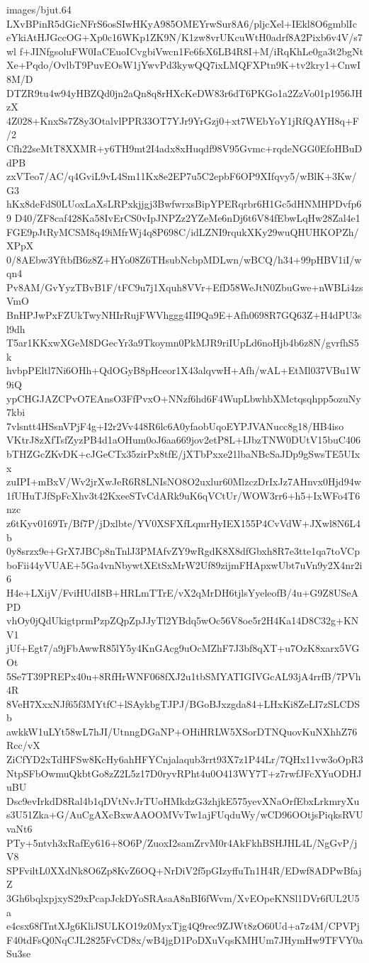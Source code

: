 \begin{filecontents*}{images/bjut.64}
LXvBPinR5dGicNFrS6osSIwHKyA985OMEYrwSur8A6/pljcXel+IEkl8O6gmblIc
eYkiAtHJGccOG+Xp0c16WKp1ZK9N/K1zw8vrUKcuWtH0adrf8A2Pixb6v4V/s7wl
f+JINfgsoluFW0IaCEuoICvgbiVwcn1Fe6fsX6LB4R8I+M/iRqKhLe0ga3t2bgNt
Xe+Pqdo/OvlbT9PuvEOsW1jYwvPd3kywQQ7ixLMQFXPtn9K+tv2kry1+CnwI8M/D
DTZR9tu4w94yHBZQd0jn2aQn8q8rHXcKeDW83r6dT6PKGo1a2ZzVo01p1956JHzX
4Z028+KnxSs7Z8y3OtalvlPPR33OT7YJr9YrGzj0+xt7WEbYoY1jRfQAYH8q+F/2
Cfh22seMtT8XXMR+y6TH9mt2I4adx8xHuqdf98V95Gvmc+rqdeNGG0EfoHBuDdPB
zxVTeo7/AC/q4GviL9vL4Sm11Kx8e2EP7u5C2epbF6OP9XIfqvy5/wBlK+3Kw/G3
hKx8deFdS0LUoxLaXsLRPxkjjgj3BwfwrxsBipYPERqrbr6H1Gc5dHNMHPDvfp69
D40/ZF8caf428Ka58IvErCS0vIpJNPZz2YZeMe6nDj6t6V84fEbwLqHw28Zal4e1
FGE9pJtRyMCSM8q49iMfrWj4q8P698C/idLZNI9rqukXKy29wuQHUHKOPZh/XPpX
0/8AEbw3YftbfB6z8Z+HYo08Z6THsubNcbpMDLwn/wBCQ/h34+99pHBV1iI/wqn4
Pv8AM/GvYyzTBvB1F/tFC9u7j1Xquh8VVr+EfD58WeJtN0ZbuGwe+nWBLi4zsVmO
BnHPJwPxFZUkTwyNHIrRujFWVhggg4II9Qa9E+Afh0698R7GQ63Z+H4dPU3sl9dh
T5ar1KKxwXGeM8DGecYr3a9Tkoymn0PkMJR9riIUpLd6noHjb4b6z8N/gvrfhS5k
hvbpPEltl7Ni6OHh+QdOGyB8pHceor1X43alqvwH+Afh/wAL+EtMl037VBu1W9iQ
ypCHGJAZCPvO7EAnsO3FfPvxO+NNzf6hd6F4WupLbwhbXMctqsqhpp5ozuNy7kbi
7vlsntt4HSsnVPjF4g+I2r2Vv448R6lc6A0yfaobUqoEYPJVANucc8g18/HB4iso
VKtrJ8zXfTsfZyzPB4d1aOHum0oJ6aa669jov2etP8L+IJbzTNW0DUtV15buC406
bTHZGcZKvDK+cJGeCTx35zirPx8tfE/jXTbPxxe21lbaNBcSaJDp9gSwsTE5UIxx
zuIPI+mBxV/Wv2jrXwJeR6R8LNIsNO8O2uxlur60MlzczDrIxJz7AHnvx0Hjd94w
1fUHuTJfSpFcXhv3t42KxeeSTvCdARk9uK6qVCtUr/WOW3rr6+h5+IxWFo4T6nzc
z6tKyv0169Tr/Bf7P/jDxlbte/YV0XSFXfLqmrHyIEX155P4CvVdW+JXwl8N6L4b
0y8srzx9e+GrX7JBCp8nTnlJ3PMAfvZY9wRgdK8X8dfGbxh8R7e3tte1qa7toVCp
boFii44yVUAE+5Ga4vnNbywtXEtSxMrW2Uf89zijmFHApxwUbt7uVn9y2X4nr2i6
H4e+LXijV/FviHUdI8B+HRLmTTrE/vX2qMrDH6tjlsYyeleofB/4u+G9Z8USeAPD
vhOy0jQdUkigtprmPzpZQpZpJJyTl2YBdq5wOc56V8oe5r2H4Ka14D8C32g+KNV1
jUf+Egt7/a9jFbAwwR85lY5y4KnGAcg9uOcMZhF7J3bf8qXT+u7OzK8xarx5VGOt
5Se7T39PREPx40u+8RfHrWNF068fXJ2u1tbSMYATIGIVGcAL93jA4rrfB/7PVh4R
8VeH7XxxNJf65f3MYtfC+lSAykbgTJPJ/BGoBJxzgda84+LHxKi8ZeLI7zSLCDSb
awkkW1uLYt58wL7hJI/UtnngDGaNP+OHiHRLW5XSorDTNQuovKuNXhhZ76Rcc/vX
ZiCfYD2xTdHFSw8KcHy6ahHFYCnjalaqub3rrt93X7z1P44Lr/7QHx11vw3oOpR3
NtpSFbOwmuQkbtGo8zZ2L5z17D0ryvRPht4u0O413WY7T+z7rwfJFcXYuODHJuBU
Dsc9evIrkdD8Ral4b1qDVtNvJrTUoHMkdzG3zhjkE575yevXNaOrfEbxLrkmryXu
s3U51Zka+G/AuCgAXcBxwAAOOMVvTw1ajFUqduWy/wCD96OOtjsPiqksRVUvaNt6
PTy+5ntvh3xRafEy616+8O6P/ZuoxI2samZrvM0r4AkFkhBSHJHL4L/NgGvP/jV8
SPFviltL0XXdNk8O6Zp8KvZ6OQ+NrDiV2f5pGIzyffuTn1H4R/EDwf8ADPwBfajZ
3Gh6bqlxpjxyS29xPcapJckDYoSRAsaA8nBI6fWvm/XvEOpeKNSl1DVr6fUL2U5a
e4csx68fTntXJg6KliJSULKO19z0MyxTjg4Q9rec9ZJWt8zO60Ud+a7z4M/CPVPj
F40tdFsQ0NqCJL2825FvCD8x/wB4jgD1PoDXuVqsKMHUm7JHymHw9TFVY0aSu3se

\end{filecontents*}
